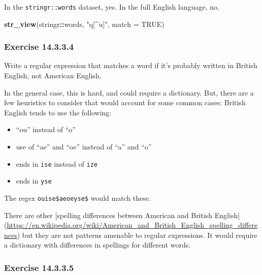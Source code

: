 \documentclass[]{book}
\newenvironment{Shaded}{\begin{snugshade}}{\end{snugshade}}
\newcommand{\DataTypeTok}[1]{\textcolor[rgb]{0.13,0.29,0.53}{#1}}
\newcommand{\KeywordTok}[1]{\textcolor[rgb]{0.13,0.29,0.53}{\textbf{#1}}}
\newcommand{\NormalTok}[1]{#1}
\newcommand{\OperatorTok}[1]{\textcolor[rgb]{0.81,0.36,0.00}{\textbf{#1}}}
\newcommand{\OtherTok}[1]{\textcolor[rgb]{0.56,0.35,0.01}{#1}}
\newcommand{\StringTok}[1]{\textcolor[rgb]{0.31,0.60,0.02}{#1}}
\providecommand{\tightlist}{%
  \setlength{\itemsep}{0pt}\setlength{\parskip}{0pt}}
\theoremstyle{plain}
\theoremstyle{remark}
\begin{document}
In the \texttt{stringr::words} dataset, yes. In the full English
language, no.

\begin{Shaded}
\begin{Highlighting}[]
\KeywordTok{str_view}\NormalTok{(stringr}\OperatorTok{::}\NormalTok{words, }\StringTok{"q[^u]"}\NormalTok{, }\DataTypeTok{match =} \OtherTok{TRUE}\NormalTok{)}
\end{Highlighting}
\end{Shaded}

\hypertarget{exercise-14.3.3.4}{%
\subsubsection*{\texorpdfstring{Exercise
{14.3.3.4}}{Exercise 14.3.3.4}}\label{exercise-14.3.3.4}}

Write a regular expression that matches a word if it's probably written
in British English, not American English.

In the general case, this is hard, and could require a dictionary. But,
there are a few heuristics to consider that would account for some
common cases: British English tends to use the following:

\begin{itemize}
\tightlist
\item
  ``ou'' instead of ``o''
\item
  use of ``ae'' and ``oe'' instead of ``a'' and ``o''
\item
  ends in \texttt{ise} instead of \texttt{ize}
\item
  ends in \texttt{yse}
\end{itemize}

The regex
\texttt{ou\textbar{}ise\$\textbar{}ae\textbar{}oe\textbar{}yse\$} would
match these.

There are other {[}spelling differences between American and British
English{]}
(\url{https://en.wikipedia.org/wiki/American_and_British_English_spelling_differences})
but they are not patterns amenable to regular expressions. It would
require a dictionary with differences in spellings for different words.

\hypertarget{exercise-14.3.3.5}{%
\subsubsection*{\texorpdfstring{Exercise
{14.3.3.5}}{Exercise 14.3.3.5}}\label{exercise-14.3.3.5}}
\end{document}
